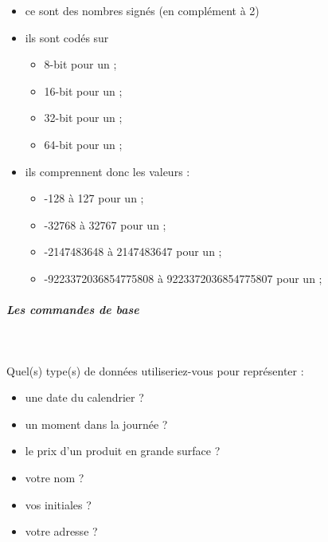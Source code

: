 \documentclass[11pt,a4paper]{article}
\begin{document}
					\begin{itemize}
				
			\item  ce sont des nombres sign\'es (en compl\'ement \`a 2)
			\item  ils sont cod\'es sur 
              
					\begin{itemize}
				
			\item  8-bit pour un \verb@byte@ ;
			\item  16-bit pour un \verb@short@ ;
			\item  32-bit pour un \verb@int@ ;
			\item  64-bit pour un \verb@long@ ;
					\end{itemize}
				
			\item  ils comprennent donc les valeurs :
              
					\begin{itemize}
				
			\item  -128 \`a 127 pour un \verb@byte@ ;
			\item  -32768 \`a 32767 pour un \verb@short@ ;
			\item  -2147483648 \`a 2147483647 pour un \verb@int@ ;
			\item  -9223372036854775808 \`a 9223372036854775807 pour un \verb@long@ ;
					\end{itemize}
				
					\end{itemize}
				
            \par
        
			
		\subparagraph{Les commandes de base} 
		
                \textcolor{white}{.} \par
             
								Quel(s) type(s) de donn\'ees utiliseriez-vous pour repr\'esenter :
							
					\begin{itemize}
				
			\item une date du calendrier ?  \textcolor{gray}{\underline{\hspace*{10em}}} 
			\item un moment dans la journ\'ee ?  \textcolor{gray}{\underline{\hspace*{10em}}} 
			\item le prix d'un produit en grande surface ? \textcolor{gray}{\underline{\hspace*{5em}}} 
			\item votre nom ?  \textcolor{gray}{\underline{\hspace*{10em}}} 
			\item vos initiales ? \textcolor{gray}{\underline{\hspace*{10em}}} 
			\item votre adresse ?  \textcolor{gray}{\underline{\hspace*{10em}}} 
					\end{itemize}
\end{document}

